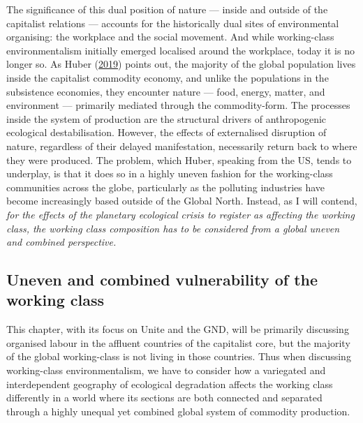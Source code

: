 \documentclass[a4paper, nobind]{templates/ociamthesis}
\begin{document}
The significance of this dual position of nature --- inside and outside of the capitalist relations --- accounts for the historically dual sites of environmental organising: the workplace and the social movement. And while working-class environmentalism initially emerged localised around the workplace, today it is no longer so. As Huber (\protect\hyperlink{ref-huber_ecological_2019}{2019}) points out, the majority of the global population lives inside the capitalist commodity economy, and unlike the populations in the subsistence economies, they encounter nature --- food, energy, matter, and environment --- primarily mediated through the commodity-form. The processes inside the system of production are the structural drivers of anthropogenic ecological destabilisation. However, the effects of externalised disruption of nature, regardless of their delayed manifestation, necessarily return back to where they were produced. The problem, which Huber, speaking from the US, tends to underplay, is that it does so in a highly uneven fashion for the working-class communities across the globe, particularly as the polluting industries have become increasingly based outside of the Global North. Instead, as I will contend, \emph{for the effects of the planetary ecological crisis to register as affecting the working class, the working class composition has to be considered from a global uneven and combined perspective.}

\hypertarget{uneven-and-combined-vulnerability-of-the-working-class}{%
\subsection{Uneven and combined vulnerability of the working class}\label{uneven-and-combined-vulnerability-of-the-working-class}}

This chapter, with its focus on Unite and the GND, will be primarily discussing organised labour in the affluent countries of the capitalist core, but the majority of the global working-class is not living in those countries. Thus when discussing working-class environmentalism, we have to consider how a variegated and interdependent geography of ecological degradation affects the working class differently in a world where its sections are both connected and separated through a highly unequal yet combined global system of commodity production.
\end{document}
